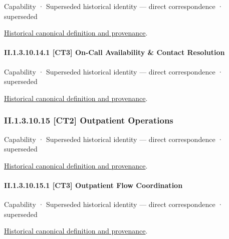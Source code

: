 \label{element:c8e6e66e8718493c9093f37d129f9ff2}
{\small Capability · Superseded historical identity — direct correspondence · superseded}\par
\href{../../../../continuum/strategy/capability/c8e6e66e8718493c9093f37d129f9ff2.md}{Historical canonical definition and provenance}.\par
\paragraph*{II.1.3.10.14.1 [CT3] On-Call Availability \& Contact Resolution}
\label{navigation:II.1.3.10.14.1}

\label{element:a03075a46f75497f8c6ba95d9c9e27c4}
{\small Capability · Superseded historical identity — direct correspondence · superseded}\par
\href{../../../../continuum/strategy/capability/a03075a46f75497f8c6ba95d9c9e27c4.md}{Historical canonical definition and provenance}.\par
\subsubsection*{II.1.3.10.15 [CT2] Outpatient Operations}
\label{navigation:II.1.3.10.15}

\label{element:3db41bc06ade4f9088eec7b8aedd7448}
{\small Capability · Superseded historical identity — direct correspondence · superseded}\par
\href{../../../../continuum/strategy/capability/3db41bc06ade4f9088eec7b8aedd7448.md}{Historical canonical definition and provenance}.\par
\paragraph*{II.1.3.10.15.1 [CT3] Outpatient Flow Coordination}
\label{navigation:II.1.3.10.15.1}

\label{element:e6c59c7b72fe44169a5fdfd08a5e91c4}
{\small Capability · Superseded historical identity — direct correspondence · superseded}\par
\href{../../../../continuum/strategy/capability/e6c59c7b72fe44169a5fdfd08a5e91c4.md}{Historical canonical definition and provenance}.\par
